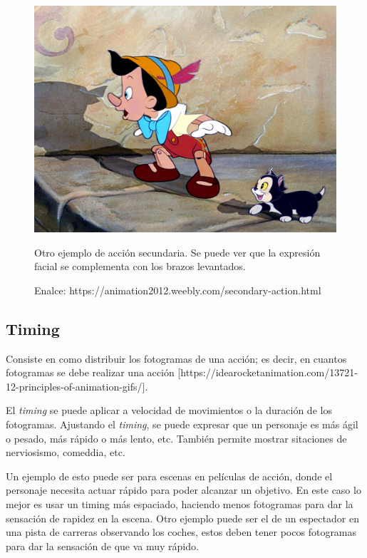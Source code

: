 \documentclass{article}
\begin{document}
\begin{figure}[H]
    \centering
    \includegraphics[width=\textwidth]{imagenes/sec-ac.jpg}
    \caption{Otro ejemplo de acción secundaria. Se puede ver que la expresión facial se complementa con los brazos levantados.}
    \caption{Enalce: https://animation2012.weebly.com/secondary-action.html}
\end{figure}
\subsection{Timing}

Consiste en como distribuir los fotogramas de una acción; es decir, en cuantos fotogramas se debe realizar una acción [https://idearocketanimation.com/13721-12-principles-of-animation-gifs/].

\bigskip

El \textit{timing} se puede aplicar a velocidad de movimientos o la duración de los fotogramas. Ajustando el \textit{timing}, se puede expresar que un personaje es más ágil o pesado, más rápido o más lento, etc. También permite mostrar sitaciones de nerviosismo, comeddia, etc.

\bigskip

Un ejemplo de esto puede ser para escenas en películas de acción, donde el personaje necesita actuar rápido para poder alcanzar un objetivo. En este caso lo mejor es usar un timing más espaciado, haciendo menos fotogramas para dar la sensación de rapidez en la escena. 
Otro ejemplo puede ser el de un espectador en una pista de carreras observando los coches, estos deben tener pocos fotogramas para dar la sensación de que va muy rápido.
\end{document}
